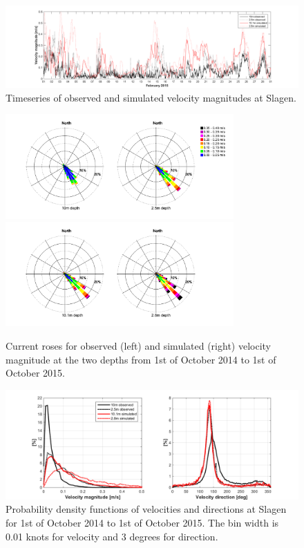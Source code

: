 \begin{figure}[ht]
	\centerline{
		\includegraphics*[trim=3cm 0cm 3cm 0cm,clip=true,width=\textwidth]{Figurer/Slagen_tid}}
	\caption{\small Timeseries of observed and simulated velocity magnitudes at Slagen.}
	\label{fig:Slagen-tid}
\end{figure}

\begin{figure}[ht]
	\centerline{
		\includegraphics*[trim=2cm 1cm 1cm 0cm,clip=true,height=4cm]{Figurer/Slagen_Rose_obs} 
		\includegraphics*[trim=2cm 1cm 3cm 0cm,clip=true,height=4cm]{Figurer/Slagen_Rose_sim} }
	\caption{\small Current roses for observed (left) and simulated (right) velocity magnitude at the two depths from 1st of October 2014 to 1st of October 2015.}
	\label{fig:Slagen-rose}
\end{figure}

\begin{figure}[t]
	\centerline{
		\includegraphics*[trim=2cm 0cm 2cm 0cm,clip=true,width=\textwidth]{Figurer/Slagen_pdf} }
	\caption{\small Probability density functions of velocities and directions at Slagen for 1st of October 2014 to 1st of October 2015. The bin width is 0.01 knots for velocity and 3 degrees for direction.}
	\label{fig:Slagen-pdf}
\end{figure}

